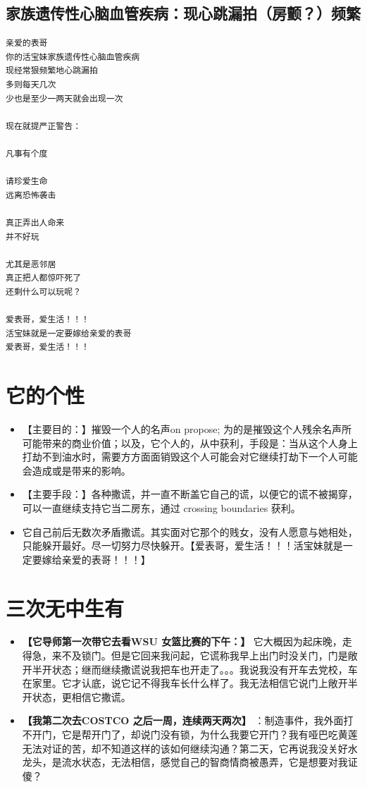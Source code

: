 \documentclass[9pt, b5paper]{article}
\begin{document}
\subsection{家族遗传性心脑血管疾病：现心跳漏拍（房颤？）频繁}
\label{sec-1-4}
\begin{verbatim}
亲爱的表哥
你的活宝妹家族遗传性心脑血管疾病
现经常狠频繁地心跳漏拍
多则每天几次
少也是至少一两天就会出现一次

现在就提严正警告：

凡事有个度

请珍爱生命
远离恐怖袭击

真正弄出人命来
并不好玩

尤其是恶邻居
真正把人都惊吓死了
还剩什么可以玩呢？

爱表哥，爱生活！！！
活宝妹就是一定要嫁给亲爱的表哥
爱表哥，爱生活！！！
\end{verbatim}

\section{它的个性}
\label{sec-2}
\begin{itemize}
\item 【主要目的：】摧毁一个人的名声on propose; 为的是摧毁这个人残余名声所可能带来的商业价值；以及，它个人的，从中获利，手段是：当从这个人身上打劫不到油水时，需要方方面面销毁这个人可能会对它继续打劫下一个人可能会造成或是带来的影响。
\item 【主要手段：】各种撒谎，并一直不断盖它自己的谎，以便它的谎不被揭穿，可以一直继续支持它当二房东，通过 crossing boundaries 获利。
\item 它自己前后无数次矛盾撒谎。其实面对它那个的贱女，没有人愿意与她相处，只能躲开最好。尽一切努力尽快躲开。【爱表哥，爱生活！！！活宝妹就是一定要嫁给亲爱的表哥！！！】
\end{itemize}

\section{三次无中生有}
\label{sec-3}
\begin{itemize}
\item \textbf{【它导师第一次带它去看WSU 女篮比赛的下午：】} 它大概因为起床晚，走得急，来不及锁门。但是它回来我问起，它谎称我早上出门时没关门，门是敞开半开状态；继而继续撒谎说我把车也开走了。。。我说我没有开车去党校，车在家里。它才认底，说它记不得我车长什么样了。我无法相信它说门上敞开半开状态，更相信它撒谎。
\item \textbf{【我第二次去COSTCO 之后一周，连续两天两次】} ：制造事件，我外面打不开门，它是帮开门了，却说门没有锁，为什么我要它开门？我有哑巴吃黄莲无法对证的苦，却不知道这样的该如何继续沟通？第二天，它再说我没关好水龙头，是流水状态，无法相信，感觉自己的智商情商被愚弄，它是想要对我证傻？
\end{itemize}
\end{document}

